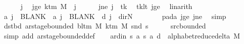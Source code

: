 \begin{isabellebody}
\ \ \ \ \isamarkupfalse%
\ j\ \isamarkupfalse%
\ jge{\isacharcolon}{\kern0pt}\ {\isachardoublequoteopen}k{\isacharunderscore}{\kern0pt}tm\ M\ {\isasymle}\ j{\isachardoublequoteclose}\isanewline
\ \ \ \ \isamarkupfalse%
\ jne{\isacharcolon}{\kern0pt}\ {\isachardoublequoteopen}j\ {\isasymnoteq}\ tk{\isachardoublequoteclose}\ \isamarkupfalse%
\ tk{\isacharunderscore}{\kern0pt}lt\ jge\ \isamarkupfalse%
\ linarith\isanewline
\ \ \ \ \isamarkupfalse%
\ {\isachardoublequoteopen}{\isacharquery}{\kern0pt}a\ j\ {\isacharequal}{\kern0pt}\ BLANK{}\ {\isasymand}\ {\isacharquery}{\kern0pt}a\ j\ {\isacharequal}{\kern0pt}\ BLANK{}\ {\isasymand}\ {\isacharquery}{\kern0pt}d\ j\ {\isacharequal}{\kern0pt}\ dir{\isachardot}{\kern0pt}N{\isachardoublequoteclose}\isanewline
\ \ \ \ \ \ \isamarkupfalse%
\ pad{\isacharunderscore}{\kern0pt}a\ jge\ jne\ \isamarkupfalse%
\ simp\isanewline
\ \ \isamarkupfalse%
\isanewline
\ \ \isamarkupfalse%
\ dst{\isacharunderscore}{\kern0pt}bd{\isacharcolon}{\kern0pt}\ {\isachardoublequoteopen}ar{\isacharunderscore}{\kern0pt}stage{\isacharunderscore}{\kern0pt}bounded\ {\isacharparenleft}{\kern0pt}bl{\isacharunderscore}{\kern0pt}tm\ M{\isacharparenright}{\kern0pt}\ {\isacharparenleft}{\kern0pt}k{\isacharunderscore}{\kern0pt}tm\ M{\isacharparenright}{\kern0pt}\ {\isacharparenleft}{\kern0pt}snd\ {\isacharquery}{\kern0pt}s{\isacharprime}{\kern0pt}{\isacharparenright}{\kern0pt}{\isachardoublequoteclose}\isanewline
\ \ \ \ \isamarkupfalse%
\ src{\isacharunderscore}{\kern0pt}bounded\ \isamarkupfalse%
\ {\isacharparenleft}{\kern0pt}simp\ add{\isacharcolon}{\kern0pt}\ ar{\isacharunderscore}{\kern0pt}stage{\isacharunderscore}{\kern0pt}bounded{\isacharunderscore}{\kern0pt}def{\isacharparenright}{\kern0pt}\isanewline
\ \ \isamarkupfalse%
\ ard{\isacharunderscore}{\kern0pt}in{\isacharcolon}{\kern0pt}\ {\isachardoublequoteopen}{\isacharparenleft}{\kern0pt}{\isacharquery}{\kern0pt}s{\isacharcomma}{\kern0pt}\ {\isacharquery}{\kern0pt}a{\isacharcomma}{\kern0pt}\ {\isacharquery}{\kern0pt}s{\isacharprime}{\kern0pt}{\isacharcomma}{\kern0pt}\ {\isacharquery}{\kern0pt}a{\isacharcomma}{\kern0pt}\ {\isacharquery}{\kern0pt}d{\isacharparenright}{\kern0pt}\ {\isasymin}\ alphabet{\isacharunderscore}{\kern0pt}reduce{\isacharunderscore}{\kern0pt}delta\ M{\isachardoublequoteclose}\isanewline
\ \ \ \ \isamarkupfalse%

\end{isabellebody}

